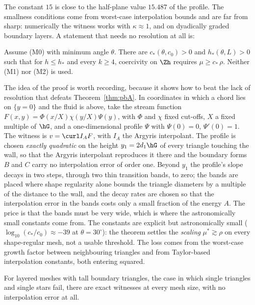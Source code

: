 The constant $15$ is close to the half-plane value $15.487$ of the profile. The smallness conditions come from worst-case interpolation bounds and are far from sharp: numerically the witness works with $\kappa\approx1$, and on dyadically graded boundary layers. A statement that needs no resolution at all is:

\begin{theorem}\label{thm:pbM0}
Assume (M0) with minimum angle $\theta$. There are $c_\ast(\theta,c_0)>0$ and $h_\ast(\theta,L)>0$ such that for $h\le h_\ast$ and every $k\ge4$, coercivity on $\Zh$ requires $\mu\ge c_\ast\,\rho$. Neither (M1) nor (M2) is used.
\end{theorem}

The idea of the proof is worth recording, because it shows how to beat the lack of resolution that defeats Theorem~\ref{thm:pbA}. In coordinates in which a chord lies on $\{y=0\}$ and the fluid is above, take the stream function $F(x,y)=\Phi(x/X)\chi(y/X)\Psi(y)$, with $\Phi$ and $\chi$ fixed cut-offs, $X$ a fixed multiple of $\hG$, and a one-dimensional profile $\Psi$ with $\Psi(0)=0$, $\Psi'(0)=1$. The witness is $v=\curl I_AF$, with $I_A$ the Argyris interpolant. The profile is chosen \emph{exactly quadratic} on the height $y_1=2d_1\hG$ of every triangle touching the wall, so that the Argyris interpolant reproduces it there and the boundary forms $B$ and $C$ carry no interpolation error of order one. Beyond $y_1$ the profile's slope decays in two steps, through two thin transition bands, to zero; the bands are placed where shape regularity alone bounds the triangle diameters by a multiple of the distance to the wall, and the decay rates are chosen so that the interpolation error in the bands costs only a small fraction of the energy $A$. The price is that the bands must be very wide, which is where the astronomically small constants come from. The constants are explicit but astronomically small ($\log_{10}(c_\ast/c_0)\approx-39$ at $\theta=30^\circ$): the theorem settles the \emph{scaling} $\mu^\ast\gtrsim\rho$ on every shape-regular mesh, not a usable threshold. The loss comes from the worst-case growth factor between neighbouring triangles and from Taylor-based interpolation constants, both entering squared.

For layered meshes with tall boundary triangles, the case in which single triangles and single stars fail, there are exact witnesses at every mesh size, with no interpolation error at all.

